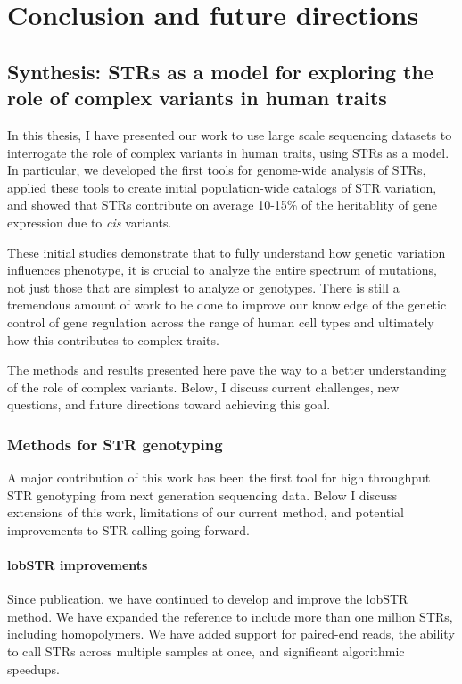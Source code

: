 \iffalse  \fi

\chapter{Conclusion and future directions}
\label{chap:conc}

\section{Synthesis: STRs as a model for exploring the role of complex variants in human traits}
In this thesis, I have presented our work to use large scale sequencing datasets to interrogate the role of complex variants in human traits, using STRs as a model. In particular, we developed the first tools for genome-wide analysis of STRs, applied these tools to create initial population-wide catalogs of STR variation, and showed that STRs contribute on average 10-15\% of the heritablity of gene expression due to \emph{cis} variants.

These initial studies demonstrate that to fully understand how genetic variation influences phenotype, it is crucial to analyze the entire spectrum of mutations, not just those that are simplest to analyze or genotypes. There is still a tremendous amount of work to be done to improve our knowledge of the genetic control of gene regulation across the range of human cell types and ultimately how this contributes to complex traits.

The methods and results presented here pave the way to a better understanding of the role of complex variants. Below, I discuss current challenges, new questions, and future directions toward achieving this goal.

\subsection{Methods for STR genotyping}
A major contribution of this work has been the first tool for high throughput STR genotyping from next generation sequencing data. Below I discuss extensions of this work, limitations of our current method, and potential improvements to STR calling going forward.

\subsubsection{lobSTR improvements}
Since publication, we have continued to develop and improve the lobSTR method. We have expanded the reference to include more than one million STRs, including homopolymers. We have added support for paired-end reads, the ability to call STRs across multiple samples at once, and significant algorithmic speedups.

